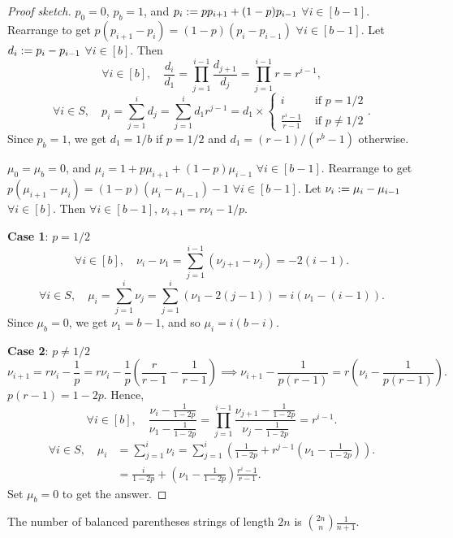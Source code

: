 \documentclass[a4paper, 12pt, fleqn]{article}
\begin{document}
\begin{proof}[Proof sketch]
$p_0 = 0$, $p_b = 1$, and $p_i := pp_{i+1} + (1-p)p_{i-1}$ $\forall i \in [b-1]$.
Rearrange to get $p(p_{i+1} - p_i) = (1-p)(p_i - p_{i-1})$ $\forall i \in [b-1]$.
Let $d_i := p_i - p_{i-1}$ $\forall i \in [b]$. Then
\[ \forall i \in [b],\quad \frac{d_i}{d_1} = \prod_{j=1}^{i-1} \frac{d_{j+1}}{d_j}
= \prod_{j=1}^{i-1} r = r^{i-1}, \]
\[ \forall i \in S,\quad
p_i = \sum_{j=1}^i d_j = \sum_{j=1}^i d_1r^{j-1} = d_1 \times \begin{cases}
i & \textrm{ if } p = 1/2 \\ \frac{r^i-1}{r-1} & \textrm{ if } p \neq 1/2
\end{cases}. \]
Since $p_b = 1$, we get $d_1 = 1/b$ if $p = 1/2$ and $d_1 = (r-1)/(r^b-1)$ otherwise.

$\mu_0 = \mu_b = 0$, and $\mu_i = 1 + p\mu_{i+1} + (1-p)\mu_{i-1}$ $\forall i \in [b-1]$.
Rearrange to get $p(\mu_{i+1}-\mu_i) = (1-p)(\mu_i - \mu_{i-1}) - 1$ $\forall i \in [b-1]$.
Let $\nu_i := \mu_i - \mu_{i-1}$ $\forall i \in [b]$.
Then $\forall i \in [b-1]$, $\nu_{i+1} = r\nu_i - 1/p$.

\textbf{Case 1}: $p = 1/2$
\[ \forall i \in [b],\quad \nu_i - \nu_1 = \sum_{j=1}^{i-1} (\nu_{j+1} - \nu_j) = -2(i-1). \]
\[ \forall i \in S,\quad \mu_i = \sum_{j=1}^i \nu_j = \sum_{j=1}^i (\nu_1 - 2(j-1))
= i(\nu_1 - (i - 1)). \]
Since $\mu_b = 0$, we get $\nu_1 = b-1$, and so $\mu_i = i(b-i)$.

\textbf{Case 2}: $p \neq 1/2$
\[ \nu_{i+1} = r\nu_i - \frac{1}{p} = r\nu_i - \frac{1}{p}\left(\frac{r}{r-1} - \frac{1}{r-1}\right)
\implies \nu_{i+1} - \frac{1}{p(r-1)} = r\left(\nu_i - \frac{1}{p(r-1)}\right). \]
$p(r-1) = 1-2p$. Hence,
\[ \forall i \in [b],\quad \frac{\nu_i - \frac{1}{1-2p}}{\nu_1 - \frac{1}{1-2p}}
= \prod_{j=1}^{i-1} \frac{\nu_{j+1} - \frac{1}{1-2p}}{\nu_j - \frac{1}{1-2p}}
= r^{i-1}. \]
\begin{align*}
\forall i \in S,\quad \mu_i &= \sum_{j=1}^i \nu_i
= \sum_{j=1}^i \left(\frac{1}{1-2p} + r^{j-1}\left(\nu_1 - \frac{1}{1-2p}\right)\right).
\\ &= \frac{i}{1-2p} + \left(\nu_1 - \frac{1}{1-2p}\right)\frac{r^i-1}{r-1}.
\end{align*}
Set $\mu_b = 0$ to get the answer.
\end{proof}

\begin{lemma}
\label{thm:bal-paren}
The number of balanced parentheses strings of length $2n$ is
$\binom{2n}{n}\frac{1}{n+1}$.
\end{lemma}
\end{document}
